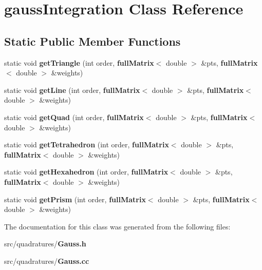 \section{gauss\-Integration Class Reference}
\label{classgaussIntegration}
\subsection*{Static Public Member Functions}
\begin{DoxyCompactItemize}
\item 
static void {\bfseries get\-Triangle} (int order, {\bf full\-Matrix}$<$ double $>$ \&pts, {\bf full\-Matrix}$<$ double $>$ \&weights)\label{classgaussIntegration_abbe1e2503298ea581e18d0c9ca3322be}

\item 
static void {\bfseries get\-Line} (int order, {\bf full\-Matrix}$<$ double $>$ \&pts, {\bf full\-Matrix}$<$ double $>$ \&weights)\label{classgaussIntegration_a5b181f102ca0700c138219739701d572}

\item 
static void {\bfseries get\-Quad} (int order, {\bf full\-Matrix}$<$ double $>$ \&pts, {\bf full\-Matrix}$<$ double $>$ \&weights)\label{classgaussIntegration_aaf6e201a853fb9e67e3a147696fd5c3a}

\item 
static void {\bfseries get\-Tetrahedron} (int order, {\bf full\-Matrix}$<$ double $>$ \&pts, {\bf full\-Matrix}$<$ double $>$ \&weights)\label{classgaussIntegration_a01e1153dc57adaa8ee384b19f57d6e79}

\item 
static void {\bfseries get\-Hexahedron} (int order, {\bf full\-Matrix}$<$ double $>$ \&pts, {\bf full\-Matrix}$<$ double $>$ \&weights)\label{classgaussIntegration_a8d36bfc64150d873d8ba6913edc1f84b}

\item 
static void {\bfseries get\-Prism} (int order, {\bf full\-Matrix}$<$ double $>$ \&pts, {\bf full\-Matrix}$<$ double $>$ \&weights)\label{classgaussIntegration_ac6ab7032b65a31f37148d6772248f105}

\end{DoxyCompactItemize}


The documentation for this class was generated from the following files\-:\begin{DoxyCompactItemize}
\item 
src/quadratures/{\bf Gauss.\-h}\item 
src/quadratures/{\bf Gauss.\-cc}\end{DoxyCompactItemize}
